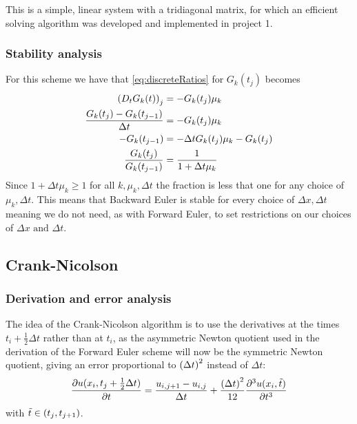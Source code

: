\documentclass[12pt,english,a4paper]{article}
\begin{document}
This is a simple, linear system with a tridiagonal matrix, for which an efficient solving algorithm was developed and implemented in project 1\cite{oblig1}.


\subsubsection{Stability analysis}
For this scheme we have that \vref{eq:discreteRatios} for \(G_k(t_j)\) becomes
\begin{align*}
\qty(D_tG_k(t))_j &= -G_k(t_j)\mu_k \\
\frac{G_k(t_j) - G_k(t_{j-1}) }{\Delta t} &= -G_k(t_j)\mu_k \\
-G_k(t_{j-1}) &= -\Delta t G_k(t_j)\mu_k - G_k(t_j) \\
\frac{G_k(t_{j}) }{G_k(t_{j-1})} &= \frac{1}{1+\Delta t \mu_k}
\end{align*}
Since \(1+\Delta t \mu_k \geq 1\) for all \(k,\mu_k,\Delta t\) the fraction is less that one for any choice of \(\mu_k,\Delta t\). This means that Backward Euler is stable for every choice of \(\Delta x, \Delta t\) meaning we do not need, as with Forward Euler, to set restrictions on our choices of \(\Delta x \text{ and } \Delta t\). 

%
\subsection{Crank-Nicolson} \label{sec:crankNicolson}

\subsubsection{Derivation and error analysis}
The idea of the Crank-Nicolson algorithm is to use the derivatives at the times \(t_i+\tfrac{1}{2}\Delta t\) rather than at \(t_i\), as the asymmetric Newton quotient used in the derivation of the Forward Euler scheme will now be the symmetric Newton quotient, giving an error proportional to \(\qty(\Delta t)^2\) instead of \(\Delta t\):
\[
    \pdv{u(x_i,t_j+\tfrac{1}{2}\Delta t)}{t} = \frac{u_{i,j+1} - u_{i,j}}{\Delta t} + \frac{\qty(\Delta t)^2}{12}\pdv[3]{u(x_i,\tilde{t})}{t}
\]
with \(\tilde{t}\in\qty(t_j,t_{j+1})\).
\end{document}
